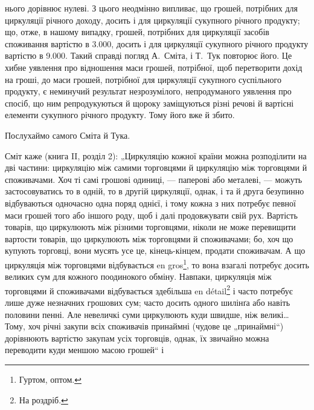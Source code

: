 \parcont{}  %
нього дорівнює нулеві. З цього неодмінно випливає, що грошей, потрібних
для циркуляції річного доходу, досить і для циркуляції сукупного
річного продукту; що, отже, в нашому випадку, грошей, потрібних для
циркуляції засобів споживання вартістю в \num{3.000}, досить і для циркуляції
сукупного річного продукту вартістю в \num{9.000}. Такий справді погляд
А.~Сміта, і Т.~Тук повторює його. Це хибне уявлення про відношення
маси грошей, потрібної, щоб перетворити дохід на гроші, до маси грошей,
потрібної для циркуляції сукупного суспільного продукту, є неминучий
результат незрозумілого, непродуманого уявлення про спосіб, що
ним репродукуються й щороку заміщуються різні речові й вартісні елементи
сукупного річного продукту. Тому його вже й збито.

Послухаймо самого Сміта й Тука.

Сміт каже (книга II, розділ 2): „Циркуляцію кожної країни можна
розподілити на дві частини: циркуляцію між самими торговцями й циркуляцію
між торговцями й споживачами. Хоч ті самі грошові одиниці, — паперові
або металеві, — можуть застосовуватись то в одній, то в другій
циркуляції, однак, і та й друга безупинно відбуваються одночасно одна поряд
однієї, і тому кожна з них потребує певної маси грошей того або
іншого роду, щоб і далі продовжувати свій рух. Вартість товарів, що циркулюють
між різними торговцями, ніколи не може перевищити вартости
товарів, що циркулюють між торговцями й споживачами; бо, хоч що купують
торговці, вони мусять усе це, кінець-кінцем, продати споживачам.
А що циркуляція між торговцями відбувається en gros\footnote*{
Гуртом, оптом. 
}, то вона взагалі потребує
досить великих сум для кожного поодинокого обміну. Навпаки, циркуляція
між торговцями й споживачами відбувається здебільша en détail\footnote*{
На роздріб. 
}
і часто потребує лише дуже незначних грошових сум; часто досить одного
шилінґа або навіть половини пенні. Але невеличкі суми циркулюють
куди швидше, ніж великі\dots{} Тому, хоч річні закупи всіх споживачів принаймні
(чудове це „принаймні“) дорівнюють вартістю закупам усіх
торговців, однак, їх звичайно можна переводити куди меншою масою
грошей“ і~

